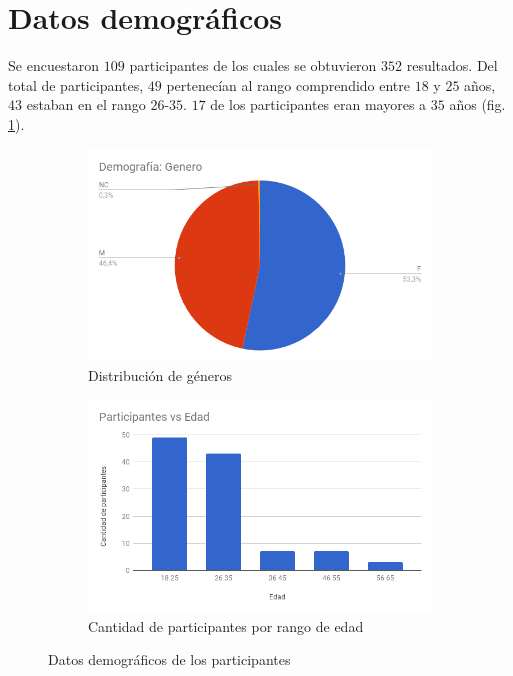 

\section{Datos demográficos}

Se encuestaron $109$ participantes de los cuales se obtuvieron $352$ resultados. Del total de participantes, $49$ pertenecían al rango comprendido entre $18$ y $25$ años, $43$ estaban en el rango $26$-$35$. $17$ de los participantes eran mayores a $35$ años (fig. \ref{genero}).

\begin{figure}
\centering
\begin{subfigure}{.5\textwidth}
  \centering
	\includegraphics[trim={0 0 0 1.6cm},clip,width=1\linewidth]{datosDemograficos/genero.png}
  \caption{Distribución de géneros}
  \label{genero}
\end{subfigure}%
\begin{subfigure}{.5\textwidth}
  \centering
	\includegraphics[trim={0 0 0 1.6cm},clip,width=1\linewidth]{datosDemograficos/edad.png}
  \caption{Cantidad de participantes por rango de edad}
  \label{fig:sub2}
\end{subfigure}
\caption{Datos demográficos de los participantes}
\label{edad}
\end{figure}

